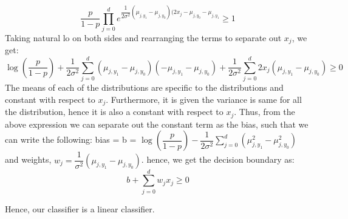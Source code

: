 \documentclass{article}
\begin{document}
	\[\dfrac{p}{1-p} \prod_{j=0}^d e^{\dfrac{1}{2\sigma^2}(\mu_{j,y_1} - \mu_{j,y_0})(2x_j - \mu_{j,y_0} - \mu_{j,y_1}} \geq 1\]
	Taking natural lo on both sides and rearranging the terms to separate out $x_j$, we get:
	\[\log(\dfrac{p}{1-p}) + \dfrac{1}{2\sigma^2}\sum_{j=0}^d (\mu_{j,y_1} - \mu_{j,y_0})(-\mu_{j,y_1} - \mu_{j,y_0}) + \dfrac{1}{2\sigma^2} \sum_{j=0}^d 2x_j (\mu_{j,y_1} - \mu_{j,y_0}) \geq 0\]
	The means of each of the distributions are specific to the distributions and constant with respect to $x_j$. Furthermore, it is given the variance is same for all the distribution, hence it is also a constant with respect to $x_j$. Thus, from the above expression we can separate out the constant term as the bias, such that we can write the following: \newline
	bias = b = $\log(\dfrac{p}{1-p}) - \dfrac{1}{2\sigma^2}\sum_{j=0}^d (\mu_{j,y_1}^2 - \mu_{j,y_0}^2)$ and \newline
	weights, $w_j = \dfrac{1}{\sigma^2}(\mu_{j,y_1} - \mu_{j,y_0})$. \newline
	hence, we get the decision boundary as:
	\[ b + \sum_{j=0}^d w_jx_j \geq 0\]

	Hence, our classifier is a linear classifier. \newline
\end{document}
